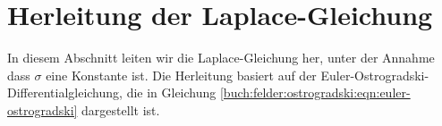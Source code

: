 %
%
%


\section{Herleitung der Laplace-Gleichung}
In diesem Abschnitt leiten wir die Laplace-Gleichung her, unter der Annahme dass $\sigma$ eine Konstante ist. Die Herleitung basiert auf der Euler-Ostrogradski-Differentialgleichung, die in Gleichung \eqref{buch:felder:ostrogradski:eqn:euler-ostrogradski} dargestellt ist.

